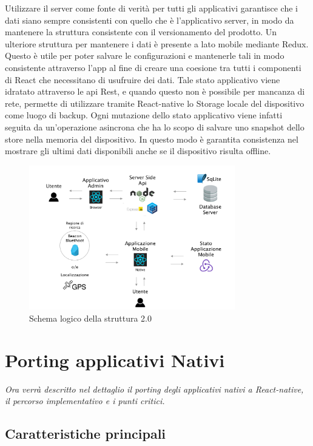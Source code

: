 Utilizzare il server come fonte di verità per tutti gli applicativi garantisce che i dati siano sempre consistenti con quello che è l'applicativo server, in modo da mantenere la struttura consistente con il versionamento del prodotto. Un ulteriore struttura per mantenere i dati è presente a lato mobile mediante Redux. Questo è utile per poter salvare le configurazioni e mantenerle tali in modo consistente attraverso l'app al fine di creare una coesione tra tutti i componenti di React che necessitano di usufruire dei dati. Tale stato applicativo viene idratato attraverso le api Rest, e quando questo non è possibile per mancanza di rete, permette di utilizzare tramite React-native lo Storage locale del dispositivo come luogo di backup. Ogni mutazione dello stato applicativo viene infatti seguita da un'operazione asincrona che ha lo scopo di salvare uno snapshot dello store nella memoria del dispositivo. In questo modo è garantita consistenza nel mostrare gli ultimi dati disponibili anche se il dispositivo risulta offline.\vspace{5mm}

\begin{figure}[h]
\centering
\includegraphics[width=0.8\textwidth]{images/stackAlakai.png}
\caption{Schema logico della struttura 2.0}
\end{figure}


\section{Porting applicativi Nativi}\vspace{5mm}
\emph{Ora verrà descritto nel dettaglio il porting degli applicativi nativi a React-native, il percorso implementativo e i punti critici.}
\vspace{5mm}
\subsection{Caratteristiche principali}\vspace{5mm}

